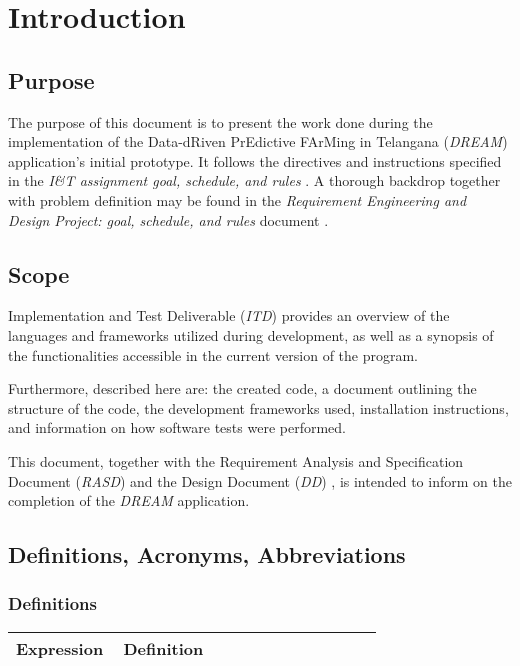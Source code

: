 \chapter{Introduction}

\section{Purpose}

The purpose of this document is to present the work done during the implementation of the Data-dRiven PrEdictive FArMing in Telangana (\textit{DREAM}) application's initial prototype. It follows the directives and instructions specified in the \textit{I\&T assignment goal, schedule, and rules} \cite{reference_doc2}. A thorough backdrop together with problem definition may be found in the \textit{Requirement Engineering and Design Project: goal, schedule, and rules} document \cite{reference_doc}.

\section{Scope}

Implementation and Test Deliverable (\textit{ITD}) provides an overview of the languages and frameworks utilized during development, as well as a synopsis of the functionalities accessible in the current version of the program.

Furthermore, described here are: the created code, a document outlining the structure of the code, the development frameworks used, installation instructions, and information on how software tests were performed.

This document, together with the Requirement Analysis and Specification Document (\textit{RASD}) \cite{rasd} and the Design Document (\textit{DD}) \cite{dd}, is intended to inform on the completion of the \textit{DREAM} application.

\section{Definitions, Acronyms, Abbreviations}

\subsection{Definitions}

\begin{center}
    \begin{longtable}{@{}p{0.28\linewidth} p{0.68\linewidth}@{}}
		\toprule
		\textbf{Expression}     & \textbf{Definition}\\
		
		\midrule

	\end{longtable}
\end{center}

